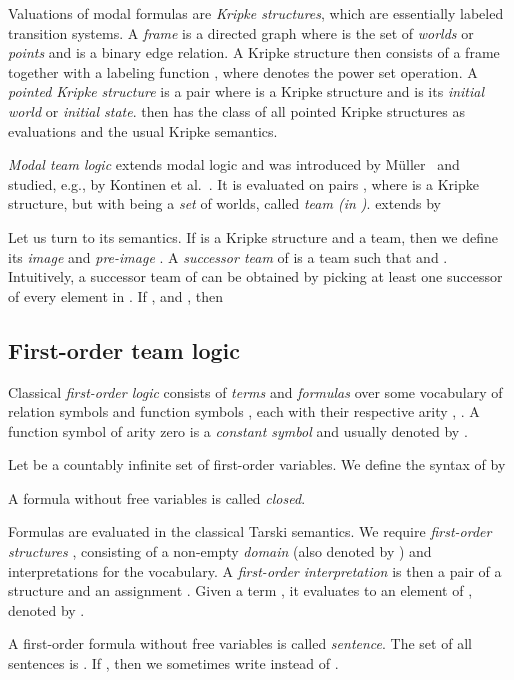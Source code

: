 \documentclass[a4paper,english,fleqn,11pt,final]{scrartcl}
\makeatletter
\newcommand{\eg}{e.g.\@\xspace}
\theoremstyle{plain}
\theoremstyle{definition}
\makeatother
\begin{document}
Valuations of modal formulas are \emph{Kripke structures}, which are essentially labeled transition systems.
A \emph{frame} is a directed graph  where  is the set of \emph{worlds} or \emph{points} and  is a binary edge relation.
A Kripke structure  then consists of a frame  together with a labeling function , where  denotes the power set operation.
A \emph{pointed Kripke structure} is a pair  where  is a Kripke structure  and  is its \emph{initial world} or \emph{initial state}.
 then has the class of all pointed Kripke structures as evaluations and the usual Kripke semantics.

\emph{Modal team logic}  extends modal logic and was introduced by Müller~\cite{mtlthesis} and studied, \eg, by Kontinen et al.\ \cite{kontinen_van_2014}.
It is evaluated on pairs , where  is a Kripke structure, but with  being a \emph{set} of worlds, called \emph{team (in )}.
 extends  by

Let us turn to its semantics.
If  is a Kripke structure and  a team, then we define its \emph{image}  and \emph{pre-image} .
A \emph{successor team}  of  is a team such that  and .
Intuitively, a successor team of  can be obtained by picking at least one successor of every element in .
If ,  and , then





\subsection{First-order team logic}

Classical \emph{first-order logic}  consists of \emph{terms} and \emph{formulas} over some vocabulary 
of relation symbols  and function symbols , each with their respective arity , .
A function symbol of arity zero is a \emph{constant symbol} and usually denoted by .

Let  be a countably infinite set of first-order variables.
We define the syntax of  by


A formula without free variables is called \emph{closed}.

Formulas are evaluated in the classical Tarski semantics.
We require \emph{first-order structures} , consisting of a non-empty \emph{domain}  (also denoted by ) and interpretations  for the vocabulary.
A \emph{first-order interpretation} is then a pair  of a structure  and an assignment .
Given a term , it evaluates to an element of , denoted by .

A first-order formula without free variables is called \emph{sentence}.
The set of all sentences is .
If , then we sometimes write  instead of .
\end{document}
